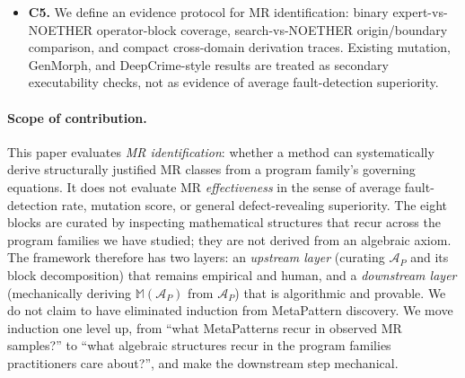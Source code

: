 \documentclass[manuscript]{acmart}
\begin{document}
\begin{itemize}
  \item \textbf{C5.} We define an evidence protocol for MR identification: binary expert-vs-NOETHER operator-block coverage, search-vs-NOETHER origin/boundary comparison, and compact cross-domain derivation traces. Existing mutation, GenMorph, and DeepCrime-style results are treated as secondary executability checks, not as evidence of average fault-detection superiority.
\end{itemize}

\paragraph{Scope of contribution.} This paper evaluates \emph{MR identification}: whether a method can systematically derive structurally justified MR classes from a program family's governing equations. It does not evaluate MR \emph{effectiveness} in the sense of average fault-detection rate, mutation score, or general defect-revealing superiority. The eight blocks are curated by inspecting mathematical structures that recur across the program families we have studied; they are not derived from an algebraic axiom. The framework therefore has two layers: an \emph{upstream layer} (curating $\mathcal{A}_P$ and its block decomposition) that remains empirical and human, and a \emph{downstream layer} (mechanically deriving $\mathbb{M}(\mathcal{A}_P)$ from $\mathcal{A}_P$) that is algorithmic and provable. We do not claim to have eliminated induction from MetaPattern discovery. We move induction one level up, from ``what MetaPatterns recur in observed MR samples?'' to ``what algebraic structures recur in the program families practitioners care about?'', and make the downstream step mechanical.
\end{document}
